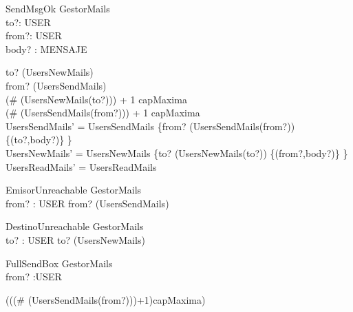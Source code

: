 \begin{schema}{SendMsgOk}
\Delta GestorMails \\
to?: USER \\
from?: USER \\
body? : MENSAJE
\where

to? \in \dom(UsersNewMails) \\
from? \in \dom(UsersSendMails) \\

(\# (UsersNewMails(to?))) + 1 \leq capMaxima \\
(\# (UsersSendMails(from?))) + 1 \leq capMaxima \\

UsersSendMails' = UsersSendMails \oplus \{from? \mapsto (UsersSendMails(from?)) \cup \{(to?,body?)\} \} \\ 
UsersNewMails' = UsersNewMails \oplus \{to? \mapsto (UsersNewMails(to?)) \cup \{(from?,body?)\} \} \\
UsersReadMails' = UsersReadMails



\end{schema}

\begin{schema}{EmisorUnreachable}
\Xi GestorMails \\
from? : USER
\where
from? \notin \dom(UsersSendMails)
\end{schema}

\begin{schema}{DestinoUnreachable}
\Xi GestorMails \\
to? : USER
\where
to? \notin \dom(UsersNewMails)
\end{schema}

\begin{schema}{FullSendBox}
\Xi GestorMails \\
from? :USER \\
\where

\lnot(((\# (UsersSendMails(from?)))+1)\leq capMaxima)
\end{schema}

